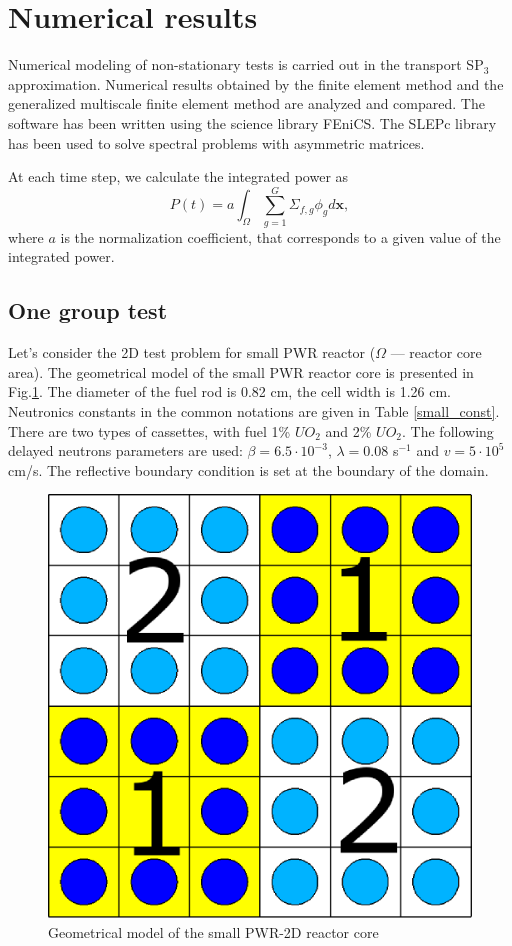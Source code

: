 \documentclass[preprint]{elsarticle}
\begin{document}
\section{Numerical results}
Numerical modeling of non-stationary tests is carried out in the transport SP$_3$ approximation.
Numerical results obtained by the finite element method and the generalized multiscale finite element method are analyzed and compared.
The software has been written using the science library FEniCS.
The SLEPc library has been used to solve spectral problems with asymmetric matrices.

At each time step, we calculate the integrated power as
	\[P(t) = a \int_{\Omega} \sum_{g=1}^{G} \Sigma_{f,g} \phi_g d \bm x,\]
where $a$ is the normalization coefficient, that corresponds to a given value of the integrated power.

\subsection{One group test} %
Let's consider the 2D test problem for small PWR reactor ($\Omega$ --- reactor core area). 
The geometrical model of the small PWR reactor core is presented in Fig.\ref{smallpwr}. 
The diameter of the fuel rod is 0.82 cm, the cell width is 1.26 cm.
Neutronics constants in the common notations are given in Table \ref{small_const}. 
There are two types of cassettes, with fuel 1\% $UO_2$ and 2\% $UO_2$.
The following delayed neutrons parameters are used: $\beta = 6.5 \cdot 10^{-3}$, $\lambda = 0.08$ s$^{-1}$ and $v = 5 \cdot 10^5$ cm/s.
The reflective boundary condition is set at the boundary of the domain.

\begin{figure}[ht]
	\centering
	    \includegraphics[width=0.45\linewidth] {small/smallpwr_geo.eps}
	\caption{Geometrical model of the small PWR-2D reactor core}
	\label{smallpwr}
\end{figure} 
\end{document}
